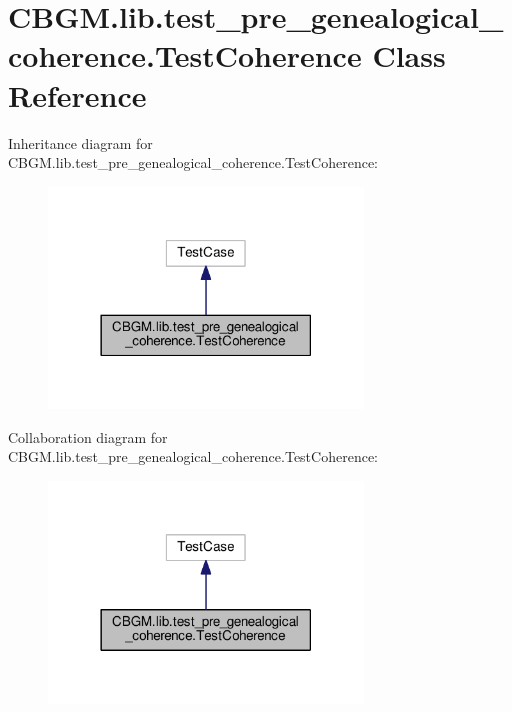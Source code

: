 \hypertarget{classCBGM_1_1lib_1_1test__pre__genealogical__coherence_1_1TestCoherence}{}\section{C\+B\+G\+M.\+lib.\+test\+\_\+pre\+\_\+genealogical\+\_\+coherence.\+Test\+Coherence Class Reference}
\label{classCBGM_1_1lib_1_1test__pre__genealogical__coherence_1_1TestCoherence}


Inheritance diagram for C\+B\+G\+M.\+lib.\+test\+\_\+pre\+\_\+genealogical\+\_\+coherence.\+Test\+Coherence\+:
\nopagebreak
\begin{figure}[H]
\begin{center}
\leavevmode
\includegraphics[width=237pt]{classCBGM_1_1lib_1_1test__pre__genealogical__coherence_1_1TestCoherence__inherit__graph}
\end{center}
\end{figure}


Collaboration diagram for C\+B\+G\+M.\+lib.\+test\+\_\+pre\+\_\+genealogical\+\_\+coherence.\+Test\+Coherence\+:
\nopagebreak
\begin{figure}[H]
\begin{center}
\leavevmode
\includegraphics[width=237pt]{classCBGM_1_1lib_1_1test__pre__genealogical__coherence_1_1TestCoherence__coll__graph}
\end{center}
\end{figure}
